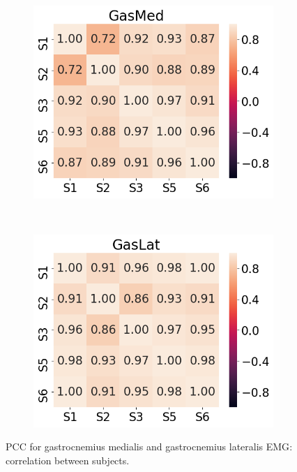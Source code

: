 \begin{figure}[!htb]
     \centering
     \begin{subfigure}[b]{0.45\textwidth}
         \centering
         \includegraphics[width=\textwidth]{img/results/correlations/GasMed_correlation_between_subjects.png}
     \end{subfigure}
     ~
     \begin{subfigure}[b]{0.45\textwidth}
         \centering
         \includegraphics[width=\textwidth]{img/results/correlations/GasLat_correlation_between_subjects.png}
     \end{subfigure}
    \caption{\ac{PCC} for gastrocnemius medialis and gastrocnemius lateralis \ac{EMG}: correlation between subjects.}
    \label{fig:A-gasmed-and-gaslat-correlation}
\end{figure}
